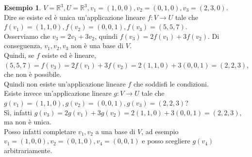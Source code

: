 \documentclass[a4paper]{article}
\theoremstyle{definition}
\newtheorem*{es}{Esempio}
\begin{document}
\begin{es}
	$V = \mathbb{R}^3, U = \mathbb{R}^3, v_1 = (1, 0, 0), v_2 = (0, 1, 0), v_3 = (2, 3, 0)$. \\
	Dire se esiste ed è unica un'applicazione lineare $f: V \rightarrow U$ tale che $f(v_1) = (1, 1, 0), f(v_2) = (0, 0, 1), f(v_3) = (5, 5, 7)$. \\
	Osserviamo che $v_3 = 2v_1 + 3v_2$, quindi $f(v_3) = 2f(v_1) + 3f(v_2)$. Di conseguenza, $v_1, v_2, v_3$ non è una base di $V$. \\
	Quindi, se $f$ esiste ed è lineare, $(5, 5, 7) = f(v_3) = 2f(v_1) + 3f(v_2) = 2(1, 1, 0) + 3(0, 0, 1) = (2, 2, 3)$, che non è possibile. \\
	Quindi non esiste un'applicazione lineare $f$ che soddisfi le condizioni. \\
	Esiste invece un'applicazione lineare $g: V \rightarrow U$ tale che $g(v_1) = (1, 1, 0), g(v_2) = (0, 0, 1), g(v_3) = (2, 2, 3)$? \\
	Sì, infatti $g(v_3) = 2g(v_1) + 3g(v_2) = 2(1, 1, 0) + 3(0, 0, 1) = (2, 2, 3)$, ma non è unica. \\
	Posso infatti completare $v_1, v_2$ a una base di $V$, ad esempio $v_1 = (1, 0, 0), v_2 = (0, 1, 0), v_4 = (0, 0, 1)$
	e posso scegliere $g(v_4)$ arbitrariamente.
\end{es}
\end{document}
